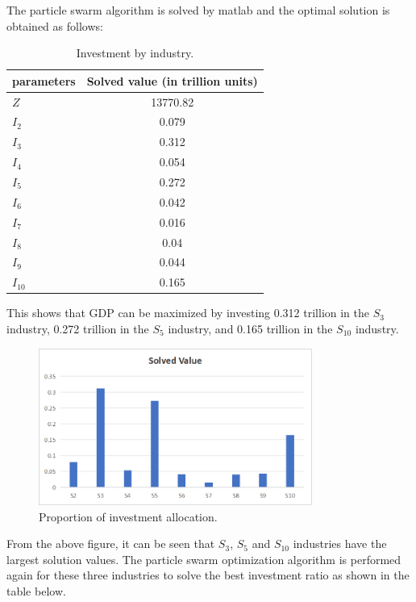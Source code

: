 \documentclass[12pt]{article}  %
\begin{document}
	The particle swarm algorithm is solved by matlab and the optimal solution is obtained as follows:
	
	\begin{table}[H]
		\centering
		\caption{Investment by industry.}
		\label{tab:solved_values}
		\begin{tabular}{lc}
			\toprule
			\textbf{parameters} & \textbf{Solved value (in  trillion units)} \\
			\midrule
			$Z$ & 13770.82 \\
			$I_2$ & 0.079 \\
			$I_3$ & 0.312 \\
			$I_4$ & 0.054 \\
			$I_5$ & 0.272 \\
			$I_6$ & 0.042 \\
			$I_7$ & 0.016 \\
			$I_8$ & 0.04 \\
			$I_9$ & 0.044 \\
			$I_{10}$ & 0.165 \\
			\bottomrule
		\end{tabular}
	\end{table}

	This shows that GDP can be maximized by investing 0.312 trillion in the $S_3$ industry, 0.272 trillion in the $S_5$ industry, and 0.165 trillion in the $S_{10}$ industry.
	
	\begin{figure}[H] %
		\centering
		\includegraphics[width=0.8\textwidth]{img/q3} %
		\caption{Proportion of investment allocation.} %
		\label{liucheng} %
	\end{figure}
	
	From the above figure, it can be seen that $S_3$, $S_5$ and $S_{10}$ industries have the largest solution values. The particle swarm optimization algorithm is performed again for these three industries to solve the best investment ratio as shown in the table below.
	
\end{document}
